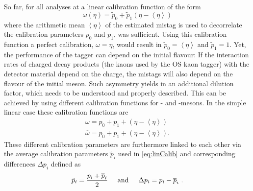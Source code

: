 So far, for all analyses at \lhcb a linear calibration function of the form
\begin{equation}
\omega(\eta)=\tilde{p}_0+\tilde{p}_1\left(\eta-\left<\eta\right>\right)\label{eq:linCalib}
\end{equation}
where the arithmetic mean $\left<\eta\right>$ of the estimated mistag is used to decorrelate the calibration parameters $p_0$ and $p_1$, was sufficient.
Using this calibration function a perfect calibration, \ie $\omega=\eta$, would result in $\tilde{p}_0=\left<\eta\right>$ and $\tilde{p}_1=1$.
Yet, the performance of the tagger can depend on the initial \B flavour:
If the interaction rates of charged decay products (\eg the kaons used by the OS kaon tagger) with the detector material depend on the charge, the mistags will also depend on the flavour of the initial \B meson.
Such asymmetry yields in an additional dilution factor, which needs to be understood and properly described.
This can be achieved by using different calibration functions for \Bz- and \Bzb-mesons.
In the simple linear case these calibration functions are
\begin{equation}
\begin{aligned}
\omega=p_0+p_1+\left(\eta-\left<\eta\right>\right)\\
\overline{\omega}=\overline{p}_0+\overline{p}_1+\left(\eta-\left<\eta\right>\right).
\end{aligned}
\end{equation}
These different calibration parameters are furthermore linked to each other via the average calibration parameters $\tilde{p}_i$ used in \cref{eq:linCalib} and corresponding differences $\Delta p_i$ defined as
\begin{equation}
\tilde{p}_i=\frac{p_i+\overline{p}_i}{2}\hspace{0.5cm}\text{and}\hspace{0.5cm}\Delta p_i=p_i-\overline{p}_i\,\,.
\end{equation}

